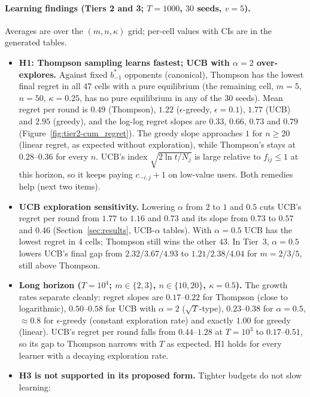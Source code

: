\documentclass[11pt]{article}
\theoremstyle{remark}
\begin{document}
\paragraph{Learning findings (Tiers 2 and 3; $T=1000$, $30$ seeds, $v=5$).} Averages are over the
$(m,n,\kappa)$ grid; per-cell values with CIs are in the generated tables.
\begin{itemize}[leftmargin=*]
  \item \textbf{H1: Thompson sampling learns fastest; UCB with $\alpha=2$ over-explores.} Against fixed
  $b^*_{-1}$ opponents (canonical), Thompson has the lowest final regret in all $47$ cells with a pure
  equilibrium (the remaining cell, $m=5$, $n=50$, $\kappa=0.25$, has no pure equilibrium in any of the $30$ seeds). Mean regret per round is $0.49$ (Thompson), $1.22$
  ($\epsilon$-greedy, $\epsilon=0.1$), $1.77$ (UCB) and $2.95$ (greedy), and the log-log regret slopes are
  $0.33$, $0.66$, $0.73$ and $0.79$ (Figure~\ref{fig:tier2-cum_regret}). The greedy slope approaches $1$
  for $n\ge20$ (linear regret, as expected without exploration), while Thompson's stays at $0.28$--$0.36$
  for every $n$. UCB's index $\sqrt{2\ln t/N_j}$ is large relative to $f_{ij}\le1$ at this horizon,
  so it keeps paying $c_{-i,j}+1$ on low-value users. Both remedies help (next two items).
  \item \textbf{UCB exploration sensitivity.} Lowering $\alpha$ from $2$ to $1$ and $0.5$ cuts UCB's
  regret per round from $1.77$ to $1.16$ and $0.73$ and its slope from $0.73$ to $0.57$ and $0.46$
  (Section~\ref{sec:results}, UCB-$\alpha$ tables). With $\alpha=0.5$ UCB has the lowest regret in $4$ cells;
  Thompson still wins the other $43$. In Tier~3, $\alpha=0.5$ lowers UCB's final gap from $2.32/3.67/4.93$ to
  $1.21/2.38/4.04$ for $m=2/3/5$, still above Thompson.
  \item \textbf{Long horizon ($T=10^4$; $m\in\{2,3\}$, $n\in\{10,20\}$, $\kappa=0.5$).} The growth rates
  separate cleanly: regret slopes are $0.17$--$0.22$ for Thompson (close to logarithmic), $0.50$--$0.58$
  for UCB with $\alpha=2$ ($\sqrt{T}$-type), $0.23$--$0.38$ for $\alpha=0.5$, $\approx0.8$ for
  $\epsilon$-greedy (constant exploration rate) and exactly $1.00$ for greedy (linear). UCB's regret per
  round falls from $0.44$--$1.28$ at $T=10^3$ to $0.17$--$0.51$, so its gap to Thompson narrows with $T$
  as expected. H1 holds for every learner with a decaying exploration rate.
  \item \textbf{H3 is not supported in its proposed form.} Tighter budgets do not slow learning:

\end{itemize}
\end{document}
